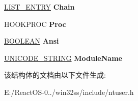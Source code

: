 \begin{DoxyCompactItemize}
\mbox{\label{structtag_h_o_o_k_a4da6a3d9f659ea17a77e95dc5d77134b}} 
\hyperlink{struct___l_i_s_t___e_n_t_r_y}{L\+I\+S\+T\+\_\+\+E\+N\+T\+RY} {\bfseries Chain}
\item 
\mbox{\label{structtag_h_o_o_k_a499d3daaff6f4c3a9b03b7cbf092e636}} 
H\+O\+O\+K\+P\+R\+OC {\bfseries Proc}
\item 
\mbox{\label{structtag_h_o_o_k_ac2a9a85d6f96917e4e4123755ed3392f}} 
\hyperlink{_processor_bind_8h_a112e3146cb38b6ee95e64d85842e380a}{B\+O\+O\+L\+E\+AN} {\bfseries Ansi}
\item 
\mbox{\label{structtag_h_o_o_k_aeb76a6d83adacacb88422289b93dcbf7}} 
\hyperlink{struct___u_n_i_c_o_d_e___s_t_r_i_n_g}{U\+N\+I\+C\+O\+D\+E\+\_\+\+S\+T\+R\+I\+NG} {\bfseries Module\+Name}
\end{DoxyCompactItemize}


该结构体的文档由以下文件生成\+:\begin{DoxyCompactItemize}
\item 
E\+:/\+React\+O\+S-\/0../win32ss/include/ntuser.\+h\end{DoxyCompactItemize}
